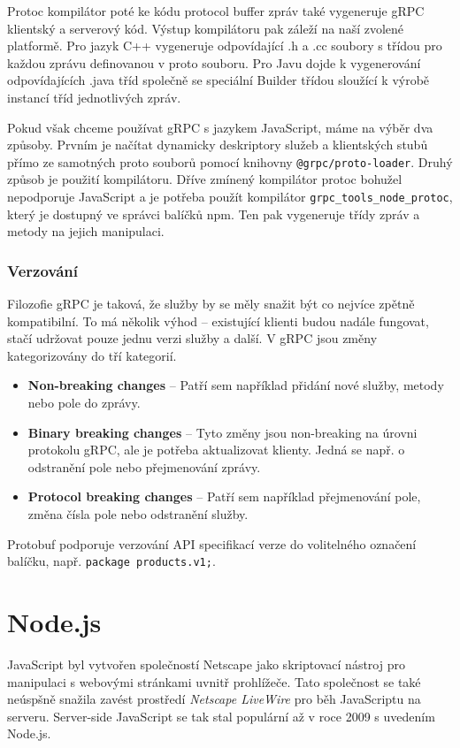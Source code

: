 \documentclass[thesis=M,czech]{FITthesis}[2019/12/23]
\begin{document}
Protoc kompilátor poté ke kódu protocol buffer zpráv také vygeneruje gRPC klientský a serverový kód. Výstup kompilátoru pak záleží na naší zvolené platformě. Pro jazyk C++ vygeneruje odpovídající .h a .cc soubory s třídou pro každou zprávu definovanou v proto souboru. Pro Javu dojde k vygenerování odpovídajících .java tříd společně se speciální Builder třídou sloužící k výrobě instancí tříd jednotlivých zpráv.

Pokud však chceme používat gRPC s jazykem JavaScript, máme na výběr dva způsoby. Prvním je načítat dynamicky deskriptory služeb a klientských stubů přímo ze samotných proto souborů pomocí knihovny \texttt{@grpc/proto-loader}.
Druhý způsob je použití kompilátoru. Dříve zmínený kompilátor protoc bohužel nepodporuje JavaScript a je potřeba použít kompilátor \texttt{grpc_tools_node_protoc}, který je dostupný ve správci balíčků npm. Ten pak vygeneruje třídy zpráv a metody na jejich manipulaci.

\subsubsection*{Verzování}
Filozofie gRPC je taková, že služby by se měly snažit být co nejvíce zpětně kompatibilní. To má několik výhod -- existující klienti budou nadále fungovat, stačí udržovat pouze jednu verzi služby a další. V gRPC jsou změny kategorizovány do tří kategorií.

\begin{itemize}
    \item \textbf{Non-breaking changes} -- Patří sem například přidání nové služby, metody nebo pole do zprávy.
    \item \textbf{Binary breaking changes} -- Tyto změny jsou non-breaking na úrovni protokolu gRPC, ale je potřeba aktualizovat klienty. Jedná se např. o odstranění pole nebo přejmenování zprávy.
    \item \textbf{Protocol breaking changes} -- Patří sem například přejmenování pole, změna čísla pole nebo odstranění služby.
\end{itemize}

Protobuf podporuje verzování API specifikací verze do volitelného označení balíčku, např. \texttt{package products.v1;}. 

\section{Node.js}
JavaScript byl vytvořen společností Netscape jako skriptovací nástroj pro manipulaci s webovými stránkami uvnitř prohlížeče. Tato společnost se také neúspšně snažila zavést prostředí \textit{Netscape LiveWire} pro běh JavaScriptu na serveru. Server-side JavaScript se tak stal populární až v roce 2009 s uvedením Node.js.
\end{document}
